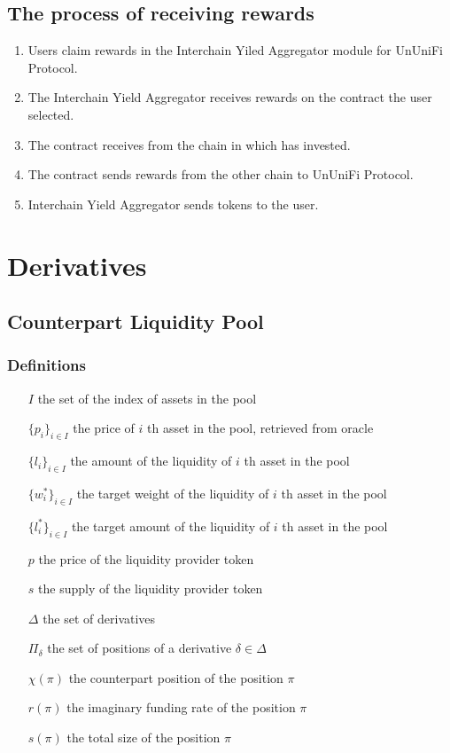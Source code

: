 \documentclass[dvipdfmx]{jsarticle}
\begin{document}
\subsection{The process of receiving rewards}
\begin{enumerate}
  \item Users claim rewards in the Interchain Yiled Aggregator module for UnUniFi Protocol.
  \item The Interchain Yield Aggregator receives rewards on the contract the user selected.
  \item The contract receives from the chain in which has invested.
  \item The contract sends rewards from the other chain to UnUniFi Protocol.
  \item Interchain Yield Aggregator sends tokens to the user.
\end{enumerate}

\section{Derivatives}

\subsection{Counterpart Liquidity Pool}

\subsubsection{Definitions}

\begin{itemize}
  \item[$I$] the set of the index of assets in the pool
  \item[$\{p_i\}_{i \in I}$] the price of $i$ th asset in the pool, retrieved from oracle
  \item[$\{l_i\}_{i \in I}$] the amount of the liquidity of $i$ th asset in the pool
  \item[$\{w_i^*\}_{i \in I}$] the target weight of the liquidity of $i$ th asset in the pool
  \item[$\{l_i^*\}_{i \in I}$] the target amount of the liquidity of $i$ th asset in the pool
  \item[$p$] the price of the liquidity provider token
  \item[$s$] the supply of the liquidity provider token
  \item[$\Delta$] the set of derivatives 
  \item[$\Pi_\delta$] the set of positions of a derivative $\delta \in \Delta$
  \item[$\chi(\pi)$] the counterpart position of the position $\pi$
  \item[$r(\pi)$] the imaginary funding rate of the position $\pi$
  \item[$s(\pi)$] the total size of the position $\pi$
\end{itemize}
\end{document}
